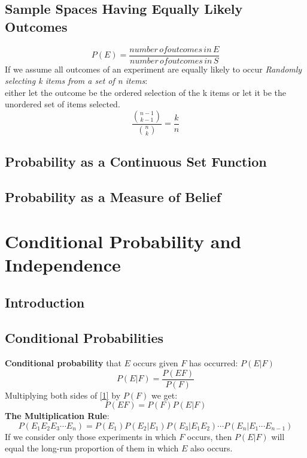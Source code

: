 \documentclass[openany]{book}
\numberwithin{equation}{section}
\begin{document}
\begin{flushleft}
\section{Sample Spaces Having Equally Likely Outcomes}
\[P(E)=\frac{number \, of outcomes \, in \, E}{number \, of outcomes \, in \, S}
\]
If we assume all outcomes of an experiment are equally likely to occur \medbreak
\textit{Randomly selecting k items from a set of n items}: \\
either let the outcome be the ordered selection of the k items or let it be the unordered set of items selected. \medbreak
\[ \frac{{n-1 \choose k-1}}{{n \choose k}} = \frac{k}{n}
\]
\section{Probability as a Continuous Set Function}

\section{Probability as a Measure of Belief}

\chapter{Conditional Probability and Independence}
\section{Introduction}

\section{Conditional Probabilities}
\textbf{Conditional probability} that $E$ occurs given $F$ has occurred: $P(E|F)$ \medbreak
\begin{equation}
\label{1}
P(E|F) = \frac{P(EF)}{P(F)}
\end{equation}
Multiplying both sides of \eqref{1} by $P(F)$ we get:
\begin{equation}
\label{2}
P(EF)=P(F)P(E|F)
\end{equation}
\textbf{The Multiplication Rule}:
\[P(E_1E_2E_3\cdots E_n) = P(E_1)P(E_2|E_1)P(E_3|E_1E_2)\cdots P(E_n|E_1\cdots E_{n-1})
\]
If we consider only those experiments in which $F$ occurs, then $P(E|F)$ will equal the long-run proportion of them in which $E$ also occurs.

\end{flushleft}
\end{document}
